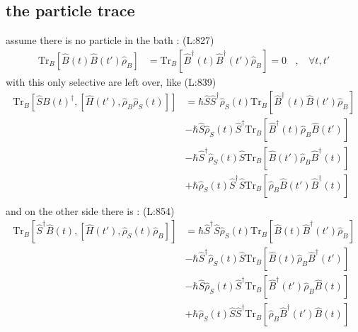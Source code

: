 \subsection{the particle trace }
 assume there is no particle in the bath :
(L:827)
\begin{equation}
\begin{split}
\text{Tr}_{B }\left[\hat{B }(t )\hat{B }(t ')\hat{\rho }_{B }\right]&=\text{Tr}_{B }\left[\hat{B }^\dagger (t )\hat{B }^\dagger (t ')\hat{\rho }_{B }\right]=0\ \ \ \ ,\ \ \ \ \forall t ,t '\end{split}
\end{equation}
 with this only selective are left over, like 
(L:839)
\begin{equation}
\begin{split}
\text{Tr}_{B }\left[\hat{S }B (t )^\dagger ,\left[\hat{H }(t '),\hat{\rho }_{B }\hat{\rho }_{S }(t )\right]\right]&=\hbar \hat{S }\hat{S }^\dagger \hat{\rho }_{S }(t )\text{Tr}_{B }\left[\hat{B }^\dagger (t )\hat{B }(t ')\hat{\rho }_{B }\right]\\
&-\hbar \hat{S }\hat{\rho }_{S }(t )\hat{S }^\dagger \text{Tr}_{B }\left[\hat{B }^\dagger (t )\hat{\rho }_{B }\hat{B }(t ')\right]\\
&-\hbar \hat{S }^\dagger \hat{\rho }_{S }(t )\hat{S }\text{Tr}_{B }\left[\hat{B }(t ')\hat{\rho }_{B }\hat{B }^\dagger (t )\right]\\
&+\hbar \hat{\rho }_{S }(t )\hat{S }^\dagger \hat{S }\text{Tr}_{B }\left[\hat{\rho }_{B }\hat{B }(t ')\hat{B }^\dagger (t )\right]\\
\end{split}
\end{equation}
 and on the other side there is  :
(L:854)
\begin{equation}
\begin{split}
\text{Tr}_{B }\left[\hat{S }^\dagger \hat{B }(t ),\left[\hat{H }(t '),\hat{\rho }_{S }(t )\hat{\rho }_{B }\right]\right]&=\hbar \hat{S }^\dagger \hat{S }\hat{\rho }_{S }(t )\text{Tr}_{B }\left[\hat{B }(t )\hat{B }^\dagger (t ')\hat{\rho }_{B }\right]\\
&-\hbar \hat{S }^\dagger \hat{\rho }_{S }(t )\hat{S }\text{Tr}_{B }\left[\hat{B }(t )\hat{\rho }_{B }\hat{B }^\dagger (t ')\right]\\
&-\hbar \hat{S }\hat{\rho }_{S }(t )\hat{S }^\dagger \text{Tr}_{B }\left[\hat{B }^\dagger (t ')\hat{\rho }_{B }\hat{B }(t )\right]\\
&+\hbar \hat{\rho }_{S }(t )\hat{S }\hat{S }^\dagger \text{Tr}_{B }\left[\hat{\rho }_{B }\hat{B }^\dagger (t ')\hat{B }(t )\right]\\
\end{split}
\end{equation}
